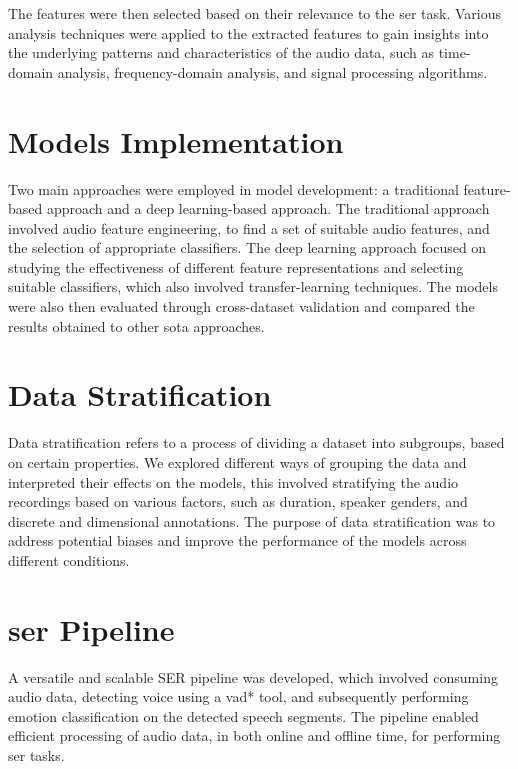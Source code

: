 The features were then selected based on their relevance to the \ac{ser} task. Various analysis techniques were applied to the extracted features to gain insights into the underlying patterns and characteristics of the audio data, such as time-domain analysis, frequency-domain analysis, and signal processing algorithms.

\section{Models Implementation}

Two main approaches were employed in model development: a traditional feature-based approach and a deep learning-based approach. The traditional approach involved audio feature engineering, to find a set of suitable audio features, and the selection of appropriate classifiers. The deep learning approach focused on studying the effectiveness of different feature representations and selecting suitable classifiers, which also involved transfer-learning techniques. The models were also then evaluated through cross-dataset validation and compared the results obtained to other \ac{sota} approaches.

\section{Data Stratification}

Data stratification refers to a process of dividing a dataset into subgroups, based on certain properties. We explored different ways of grouping the data and interpreted their effects on the models, this involved stratifying the audio recordings based on various factors, such as duration, speaker genders, and discrete and dimensional annotations. The purpose of data stratification was to address potential biases and improve the performance of the models across different conditions.

\section{\ac{ser} Pipeline}

A versatile and scalable SER pipeline was developed, which involved consuming audio data, detecting voice using a \ac{vad*} tool, and subsequently performing emotion classification on the detected speech segments. The pipeline enabled efficient processing of audio data, in both online and offline time, for performing \ac{ser} tasks.

